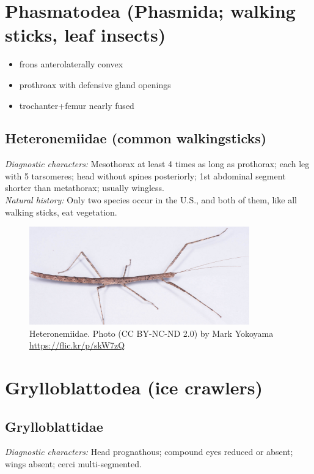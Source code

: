 \documentclass[letterpaper, 11pt]{article}
\begin{document}
\section{Phasmatodea (Phasmida; walking sticks, leaf insects)}
\begin{itemize}
\item frons anterolaterally convex
\item prothroax with defensive gland openings
\item trochanter+femur nearly fused
\end{itemize}

\subsection{Heteronemiidae (common walkingsticks)}
\noindent{}\textit{Diagnostic characters:} Mesothorax at least 4 times as long as prothorax; each leg with 5 tarsomeres; head without spines posteriorly; 1st abdominal segment shorter than metathorax; usually wingless.\\

\noindent{}\textit{Natural history:} Only two species occur in the U.S., and both of them, like all walking sticks, eat vegetation. \\

\begin{figure}[ht!]
  \centering
    \includegraphics[width=0.85\textwidth]{phasma}
  \caption{Heteronemiidae. Photo (CC BY-NC-ND 2.0) by Mark Yokoyama \url{https://flic.kr/p/skW7zQ}}
  \label{fig:heteronemiid}
\end{figure}

\section{Grylloblattodea (ice crawlers)}
\subsection{Grylloblattidae}
\noindent{}\textit{Diagnostic characters:} Head prognathous; compound eyes reduced or absent; wings absent; cerci multi-segmented.\\
\end{document}
